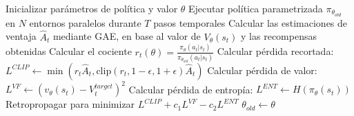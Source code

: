 \documentclass[12pt, a4paper]{article}
\begin{document}
\begin{algorithm}[H]
\caption{Proximal Policy Optimization (PPO-Clip)}\label{alg:ppo}
\begin{algorithmic}[1]
\State Inicializar parámetros de política y valor $\theta$
    \State Ejecutar política parametrizada $\pi_{\theta_{old}}$ en $N$ entornos paralelos durante $T$ pasos temporales
    \State Calcular las estimaciones de ventaja $\hat{A}_t$ mediante GAE, en base al valor de $V_\theta(s_t)$ y las recompensas obtenidas
            \State Calcular el cociente $r_t(\theta) = \frac{\pi_\theta(a_t|s_t)}{\pi_{\theta_{old}}(a_t|s_t)}$
            \State Calcular pérdida recortada: $L^{CLIP} \leftarrow \min(r_t \hat{A}_t, \text{clip}(r_t, 1-\epsilon, 1+\epsilon)\hat{A}_t)$
            \State Calcular pérdida de valor: $L^{VF} \leftarrow (v_\theta(s_t) - V_t^{target})^2$
            \State Calcular pérdida de entropía: $L^{ENT} \leftarrow H(\pi_\theta(s_t))$
            \State Retropropagar para minimizar $L^{CLIP} + c_1 L^{VF} - c_2 L^{ENT}$
        \EndFor
    \EndFor
    \State $\theta_{old} \leftarrow \theta$
\EndFor
\end{algorithmic}
\end{algorithm}
\end{document}
